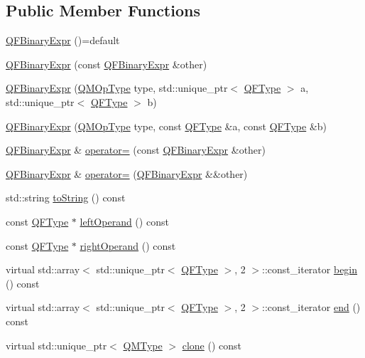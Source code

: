 \subsection*{Public Member Functions}
\begin{DoxyCompactItemize}
\item 
\hyperlink{classQuickMath_1_1QFBinaryExpr_ae6ec6206deb318cf4b2865c879aa9fc6}{Q\+F\+Binary\+Expr} ()=default
\item 
\hyperlink{classQuickMath_1_1QFBinaryExpr_af88afa909437217a78f67c8cf617e244}{Q\+F\+Binary\+Expr} (const \hyperlink{classQuickMath_1_1QFBinaryExpr}{Q\+F\+Binary\+Expr} \&other)
\item 
\hyperlink{classQuickMath_1_1QFBinaryExpr_a61d5fbfee98a7795dc1837db4482cc76}{Q\+F\+Binary\+Expr} (\hyperlink{namespaceQuickMath_a0a6c67b9dab0cfd5f3e711b0573545cb}{Q\+M\+Op\+Type} type, std\+::unique\+\_\+ptr$<$ \hyperlink{classQuickMath_1_1QFType}{Q\+F\+Type} $>$ a, std\+::unique\+\_\+ptr$<$ \hyperlink{classQuickMath_1_1QFType}{Q\+F\+Type} $>$ b)
\item 
\hyperlink{classQuickMath_1_1QFBinaryExpr_a8bff2704629a1ccc2050933709ce21b5}{Q\+F\+Binary\+Expr} (\hyperlink{namespaceQuickMath_a0a6c67b9dab0cfd5f3e711b0573545cb}{Q\+M\+Op\+Type} type, const \hyperlink{classQuickMath_1_1QFType}{Q\+F\+Type} \&a, const \hyperlink{classQuickMath_1_1QFType}{Q\+F\+Type} \&b)
\item 
\hyperlink{classQuickMath_1_1QFBinaryExpr}{Q\+F\+Binary\+Expr} \& \hyperlink{classQuickMath_1_1QFBinaryExpr_a2bda8f3570dc2b9e926d0b6efe9efcfd}{operator=} (const \hyperlink{classQuickMath_1_1QFBinaryExpr}{Q\+F\+Binary\+Expr} \&other)
\item 
\hyperlink{classQuickMath_1_1QFBinaryExpr}{Q\+F\+Binary\+Expr} \& \hyperlink{classQuickMath_1_1QFBinaryExpr_a615303d5a9e584de83ae489578aefe04}{operator=} (\hyperlink{classQuickMath_1_1QFBinaryExpr}{Q\+F\+Binary\+Expr} \&\&other)
\item 
std\+::string \hyperlink{classQuickMath_1_1QFBinaryExpr_a676c949b30d14f919dcdf20151a5b3fe}{to\+String} () const 
\item 
const \hyperlink{classQuickMath_1_1QFType}{Q\+F\+Type} $\ast$ \hyperlink{classQuickMath_1_1QFBinaryExpr_a1b68ff06a8386d1c1f95a1a781660d98}{left\+Operand} () const 
\item 
const \hyperlink{classQuickMath_1_1QFType}{Q\+F\+Type} $\ast$ \hyperlink{classQuickMath_1_1QFBinaryExpr_aead11f57ff726fba3e6227d567737bf9}{right\+Operand} () const 
\item 
virtual std\+::array$<$ std\+::unique\+\_\+ptr$<$ \hyperlink{classQuickMath_1_1QFType}{Q\+F\+Type} $>$, 2 $>$\+::const\+\_\+iterator \hyperlink{classQuickMath_1_1QFBinaryExpr_a0f9c25472343592ffbd3337da671a25a}{begin} () const 
\item 
virtual std\+::array$<$ std\+::unique\+\_\+ptr$<$ \hyperlink{classQuickMath_1_1QFType}{Q\+F\+Type} $>$, 2 $>$\+::const\+\_\+iterator \hyperlink{classQuickMath_1_1QFBinaryExpr_ad22a3e71d2f7170528a499c994439a7b}{end} () const 
\item 
virtual std\+::unique\+\_\+ptr$<$ \hyperlink{classQuickMath_1_1QMType}{Q\+M\+Type} $>$ \hyperlink{classQuickMath_1_1QFBinaryExpr_a7f49aef7dd9b8b4c144bbf30395d9051}{clone} () const 
\end{DoxyCompactItemize}
